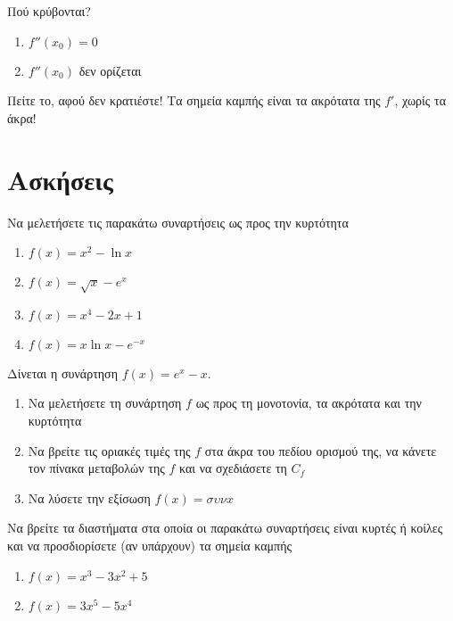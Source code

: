 \documentclass{presentation}
\begin{document}
\begin{frame}{Πού κρύβονται?}
    \begin{enumerate}
        \item<1-> $f''(x_0)=0$
        \item<2-> $f''(x_0)$ δεν ορίζεται
    \end{enumerate}
     {Πείτε το, αφού δεν κρατιέστε! Τα σημεία καμπής είναι τα ακρότατα της $f'$, χωρίς τα άκρα!}
\end{frame}

\section{Ασκήσεις}
\begin{askisi}
    Να μελετήσετε τις παρακάτω συναρτήσεις ως προς την κυρτότητα
    \begin{enumerate}
        \item<1-> $f(x)=x^2-\ln x$
        \item<2-> $f(x)=\sqrt{x}-e^x$
        \item<3-> $f(x)=x^4-2x+1$
        \item<4-> $f(x)=x\ln x-e^{-x}$
    \end{enumerate}

\end{askisi}

\begin{askisi}
    Δίνεται η συνάρτηση $f(x)=e^x-x$.
    \begin{enumerate}
        \item<1-> Να μελετήσετε τη συνάρτηση $f$ ως προς τη μονοτονία, τα ακρότατα και την κυρτότητα
        \item<2-> Να βρείτε τις οριακές τιμές της $f$ στα άκρα του πεδίου ορισμού της, να κάνετε τον πίνακα μεταβολών της $f$ και να σχεδιάσετε τη $C_f$
        \item<3-> Να λύσετε την εξίσωση $f(x)=συνx$
    \end{enumerate}

\end{askisi}

\begin{askisi}
    Να βρείτε τα διαστήματα στα οποία οι παρακάτω συναρτήσεις είναι κυρτές ή κοίλες και να προσδιορίσετε (αν υπάρχουν) τα σημεία καμπής
    \begin{enumerate}
        \item<1-> $f(x)=x^3-3x^2+5$
        \item<2-> $f(x)=3x^5-5x^4$
    \end{enumerate}

\end{askisi}
\end{document}
